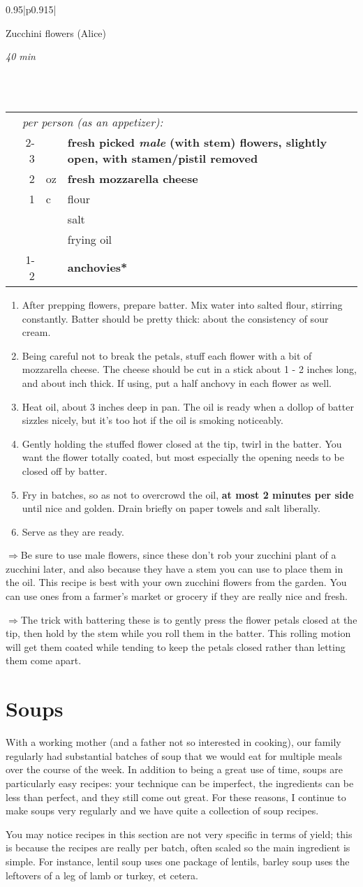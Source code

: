 \documentclass[8pt]{report}
\newcommand{\ingredmargin}{0.25cm}
\newcommand{\recipegroup}[2]{\chapter*{#1} \addcontentsline{toc}{chapter}{#1} \label{chap:#1} \vspace{4cm} {#2} \newpage}
\newcommand{\fr}[2]{\nicefrac{#1}{#2}}
\newenvironment{creditrecipe}[4]
  {\bigskip \bigskip 
\begin{tabular*}{0.95\textwidth}{|p{0.915\textwidth}|} \hline \vspace{0.25mm}
\begin{minipage}{0.7\textwidth}	\begin{flushleft} {\Large \textsf{#1} (#4)} \end{flushleft} \end{minipage}
\begin{minipage}{0.2\textwidth} \begin{flushright} \emph{#2} \end{flushright} \end{minipage} \\ \\ \hline
\begin{ingreds}{#3} \addcontentsline{toc}{section}{#1} \phantomsection \label{rec:#1}} 
  {\\ \hline \end{tabular*} \noindent}
\newenvironment{ingreds}[1]
  {\begin{tabular}{lrlp{0.6\textwidth}} \hspace{\ingredmargin} & \multicolumn{3}{l}{\it #1:} \\}
  {\end{tabular} \medskip}
\newcommand{\ingredsdone}{\end{ingreds}\begin{enumerate}}
\newcommand{\stepsdone}{\end{enumerate} \medskip}
\newcommand{\notefont}{\renewcommand*\rmdefault{pzc}\normalfont\upshape \large}
\newcommand{\ingredient}[3]{\hspace{\ingredmargin} & #1 & #2 & #3 \\}
\newcommand{\tip}{$\Rightarrow$}
\begin{document}
\begin{creditrecipe}{Zucchini flowers}{40 min}{per person (as an appetizer)}{Alice}
\index{zucchini!flowers} \index{vegetables!zucchini flowers} \index{appetizers!zucchini flowers}
\ingredient{2-3}{}{\bf fresh picked {\em male} (with stem) flowers, slightly open, with stamen/pistil removed}
\ingredient{2}{oz}{\bf fresh mozzarella cheese}
\ingredient{1}{c}{flour}
\ingredient{}{}{salt}
\ingredient{}{}{frying oil}
\ingredient{1-2}{}{\bf anchovies*}
\ingredsdone
\item After prepping flowers, prepare batter.  Mix water into salted flour, stirring constantly.  Batter should be pretty thick: about the consistency of sour cream.
\item Being careful not to break the petals, stuff each flower with a bit of mozzarella cheese.  The cheese should be cut in a stick about 1 \fr12 - 2 inches long,
and about \fr12 inch thick.  If using, put a half anchovy in each flower as well.
\item Heat oil, about 3 inches deep in pan.  The oil is ready when a dollop of batter sizzles nicely, but it's too hot if the oil is smoking noticeably.
\item Gently holding the stuffed flower closed at the tip, twirl in the batter.  You want the flower totally coated, but most especially the opening needs to be closed
off by batter.
\item Fry in batches, so as not to overcrowd the oil, {\bf at most 2 minutes per side} until nice and golden.  Drain briefly on paper towels and salt liberally.
\item Serve as they are ready.  
\stepsdone
\noindent \tip Be sure to use male flowers, since these don't rob your zucchini plant of a zucchini later, and also because they have a stem you can use to place 
them in the oil.  This recipe is best with your own zucchini flowers from the garden.  You can use ones from a farmer's market or grocery if they are really nice and
fresh. \medskip

\noindent \tip The trick with battering these is to gently press the flower petals closed at the tip, then hold by the stem while you roll them in the batter.  This
rolling motion will get them coated while tending to keep the petals closed rather than letting them come apart.
\end{creditrecipe}

\recipegroup{Soups}{\notefont With a working mother (and a father not so interested in cooking), our family regularly had substantial batches of soup that we would eat for multiple meals over the course of the week.  In addition to being a great use of time, soups are particularly easy recipes: your technique can be imperfect, the ingredients can be less than perfect, and they still come out great.  For these reasons, I continue to make soups very regularly and we have quite a collection of soup recipes.

You may notice recipes in this section are not very specific in terms of yield; this is because the recipes are really per batch, often scaled so the main ingredient is simple.  For instance, lentil soup uses one package of lentils, barley soup uses the leftovers of a leg of lamb or turkey, et cetera.}
\end{document}
